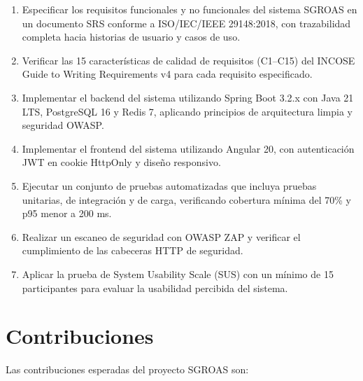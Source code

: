 \begin{enumerate}
  \item Especificar los requisitos funcionales y no funcionales del sistema SGROAS en un documento SRS conforme a ISO/IEC/IEEE 29148:2018, con trazabilidad completa hacia historias de usuario y casos de uso.

  \item Verificar las 15 características de calidad de requisitos (C1--C15) del INCOSE Guide to Writing Requirements v4 para cada requisito especificado.

  \item Implementar el backend del sistema utilizando Spring Boot 3.2.x con Java 21 LTS, PostgreSQL 16 y Redis 7, aplicando principios de arquitectura limpia y seguridad OWASP.

  \item Implementar el frontend del sistema utilizando Angular 20, con autenticación JWT en cookie HttpOnly y diseño responsivo.

  \item Ejecutar un conjunto de pruebas automatizadas que incluya pruebas unitarias, de integración y de carga, verificando cobertura mínima del 70\% y p95 menor a 200 ms.

  \item Realizar un escaneo de seguridad con OWASP ZAP y verificar el cumplimiento de las cabeceras HTTP de seguridad.

  \item Aplicar la prueba de System Usability Scale (SUS) con un mínimo de 15 participantes para evaluar la usabilidad percibida del sistema.
\end{enumerate}

\section{Contribuciones}
\label{sec:contribuciones}

Las contribuciones esperadas del proyecto SGROAS son:

